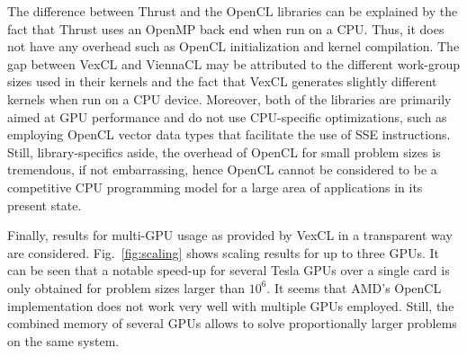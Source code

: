 \documentclass[final]{siamltex}
\newcommand{\figref}[1]{Fig.~\ref{#1}}
\begin{document}
The difference between Thrust and the OpenCL libraries can be explained by the
fact that Thrust uses an OpenMP back end when run on a CPU. Thus, it does not
have any overhead such as OpenCL initialization and kernel compilation.  The
gap between VexCL and ViennaCL may be attributed to the different work-group
sizes used in their kernels and the fact that VexCL generates slightly
different kernels when run on a CPU device. Moreover, both of the libraries are
primarily aimed at GPU performance and do not use CPU-specific optimizations,
such as employing OpenCL vector data types that facilitate the use of SSE
instructions.  Still, library-specifics aside, the overhead of OpenCL for small problem sizes is
tremendous, if not embarrassing, hence OpenCL cannot be considered to be a
competitive CPU programming model for a large area of applications in its
present state.




Finally, results for multi-GPU usage as provided by VexCL in a transparent way
are considered. \figref{fig:scaling} shows scaling results for up to three
GPUs. It can be seen that a notable speed-up for several Tesla GPUs over a
single card is only obtained for problem sizes larger than $10^6$.  It seems
that AMD's OpenCL implementation does not work very well with multiple GPUs
employed. Still, the combined memory of several GPUs allows to solve proportionally
larger problems on the same system.
\end{document}
